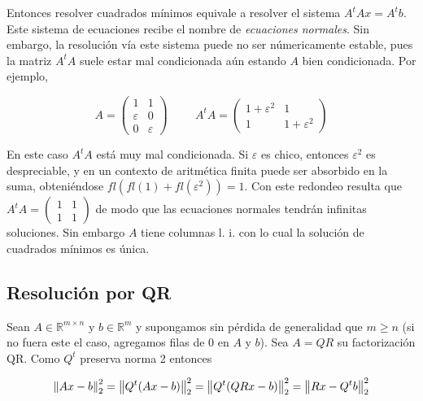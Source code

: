 Entonces resolver cuadrados mínimos equivale a resolver el sistema $A^tAx = A^tb$. Este sistema de ecuaciones recibe el nombre de \textit{ecuaciones normales}. Sin embargo, la resolución vía este sistema puede no ser númericamente estable, pues la matriz $A^tA$ suele estar mal condicionada aún estando $A$ bien condicionada. Por ejemplo,

\[A = \begin{pmatrix}
1 & 1\\
\varepsilon & 0 \\
0 & \varepsilon
\end{pmatrix}
\hspace{1cm}
A^tA = \begin{pmatrix}
1 + \varepsilon^2 & 1\\
1 & 1 + \varepsilon^2
\end{pmatrix}\]

En este caso $A^tA$ está muy mal condicionada. Si $\varepsilon$ es chico, entonces $\varepsilon^2$ es despreciable, y en un contexto de aritmética finita puede ser absorbido en la suma, obteniéndose $fl(fl(1) + fl(\varepsilon^2)) = 1$. Con este redondeo resulta que $A^tA = \begin{pmatrix}1 & 1 \\ 1 & 1 \end{pmatrix}$ de modo que las ecuaciones normales tendrán infinitas soluciones. Sin embargo $A$ tiene columnas l. i. con lo cual la solución de cuadrados mínimos es única.

\subsection{Resolución por QR}

Sean $A \in \mathbb{R}^{m \times n}$ y $b \in \mathbb{R}^m$ y supongamos sin pérdida de generalidad que $m \geq n$ (si no fuera este el caso, agregamos filas de 0 en $A$ y $b$). Sea $A = QR$ su factorización QR. Como $Q^t$ preserva norma 2 entonces

\[\left\lVert Ax - b\right\rVert_2^2 = \left\lVert Q^t(Ax - b)\right\rVert_2^2 = \left\lVert Q^t(QRx - b)\right\rVert_2^2 = \left\lVert Rx - Q^tb\right\rVert_2^2\]

